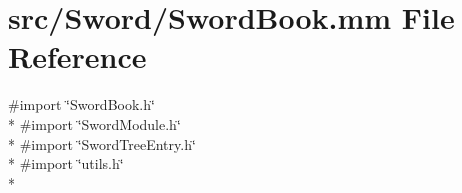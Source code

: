 \hypertarget{_sword_book_8mm}{\section{src/\-Sword/\-Sword\-Book.mm File Reference}
\label{_sword_book_8mm}
}
{\ttfamily \#import \char`\"{}Sword\-Book.\-h\char`\"{}}\\*
{\ttfamily \#import \char`\"{}Sword\-Module.\-h\char`\"{}}\\*
{\ttfamily \#import \char`\"{}Sword\-Tree\-Entry.\-h\char`\"{}}\\*
{\ttfamily \#import \char`\"{}utils.\-h\char`\"{}}\\*
